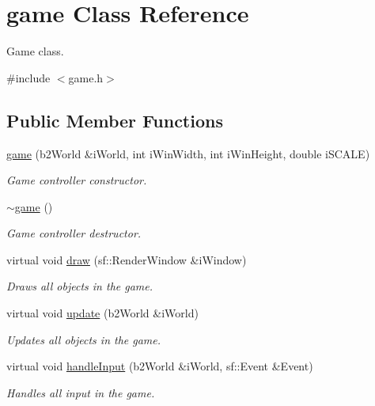 \hypertarget{classgame}{}\section{game Class Reference}
\label{classgame}


Game class.  




{\ttfamily \#include $<$game.\+h$>$}

\subsection*{Public Member Functions}
\begin{DoxyCompactItemize}
\item 
\hyperlink{classgame_a57f5809d56037158e9bafa65c8173609}{game} (b2\+World \&i\+World, int i\+Win\+Width, int i\+Win\+Height, double i\+S\+C\+A\+LE)
\begin{DoxyCompactList}\small\item\em Game controller constructor. \end{DoxyCompactList}\item 
\hyperlink{classgame_ae87abd20c4d8a7906fa48e690a5f1d07}{$\sim$game} ()
\begin{DoxyCompactList}\small\item\em Game controller destructor. \end{DoxyCompactList}\item 
virtual void \hyperlink{classgame_a7d9e3663af2341b48d6de562554f47b1}{draw} (sf\+::\+Render\+Window \&i\+Window)
\begin{DoxyCompactList}\small\item\em Draws all objects in the game. \end{DoxyCompactList}\item 
virtual void \hyperlink{classgame_aaac7fea645c92fd364bdccb24d59efd2}{update} (b2\+World \&i\+World)
\begin{DoxyCompactList}\small\item\em Updates all objects in the game. \end{DoxyCompactList}\item 
virtual void \hyperlink{classgame_a9733b814ab29dd4407441c17fa58b187}{handle\+Input} (b2\+World \&i\+World, sf\+::\+Event \&Event)
\begin{DoxyCompactList}\small\item\em Handles all input in the game. \end{DoxyCompactList}\item 

\end{DoxyCompactItemize}
